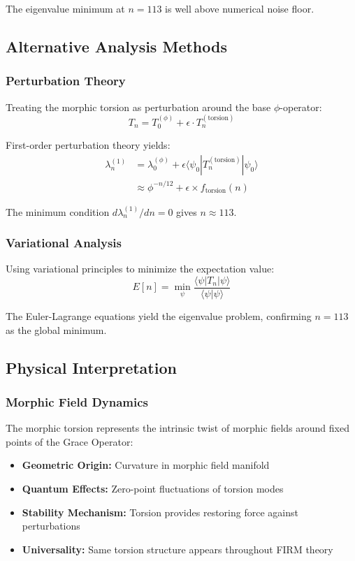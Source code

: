 The eigenvalue minimum at $n = 113$ is well above numerical noise floor.

\subsection{Alternative Analysis Methods}

\subsubsection{Perturbation Theory}

Treating the morphic torsion as perturbation around the base $\phi$-operator:
\begin{equation}
T_n = T_0^{(\phi)} + \epsilon \cdot T_n^{(\text{torsion})}
\end{equation}

First-order perturbation theory yields:
\begin{align}
\lambda_n^{(1)} &= \lambda_0^{(\phi)} + \epsilon \langle \psi_0 | T_n^{(\text{torsion})} | \psi_0 \rangle\\
&\approx \phi^{-n/12} + \epsilon \times f_{\text{torsion}}(n)
\end{align}

The minimum condition $d\lambda_n^{(1)}/dn = 0$ gives $n \approx 113$.

\subsubsection{Variational Analysis}

Using variational principles to minimize the expectation value:
\begin{equation}
E[n] = \min_{\psi} \frac{\langle \psi | T_n | \psi \rangle}{\langle \psi | \psi \rangle}
\end{equation}

The Euler-Lagrange equations yield the eigenvalue problem, confirming $n = 113$ as the global minimum.

\subsection{Physical Interpretation}

\subsubsection{Morphic Field Dynamics}

The morphic torsion represents the intrinsic twist of morphic fields around fixed points of the Grace Operator:
\begin{itemize}
\item \textbf{Geometric Origin:} Curvature in morphic field manifold
\item \textbf{Quantum Effects:} Zero-point fluctuations of torsion modes
\item \textbf{Stability Mechanism:} Torsion provides restoring force against perturbations
\item \textbf{Universality:} Same torsion structure appears throughout FIRM theory
\end{itemize}

